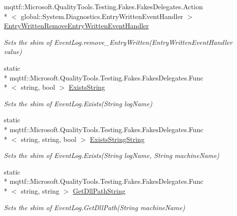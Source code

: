 \begin{DoxyCompactItemize}
mqttf\-::\-Microsoft.\-Quality\-Tools.\-Testing.\-Fakes.\-Fakes\-Delegates.\-Action\\*
$<$ global\-::\-System.\-Diagnostics.\-Entry\-Written\-Event\-Handler $>$ \hyperlink{class_system_1_1_diagnostics_1_1_fakes_1_1_shim_event_log_a504129f76e5a2c76072240100c5d1541}{Entry\-Written\-Remove\-Entry\-Written\-Event\-Handler}
\begin{DoxyCompactList}\small\item\em Sets the shim of Event\-Log.\-remove\-\_\-\-Entry\-Written(\-Entry\-Written\-Event\-Handler value)\end{DoxyCompactList}\item 
static \\*
mqttf\-::\-Microsoft.\-Quality\-Tools.\-Testing.\-Fakes.\-Fakes\-Delegates.\-Func\\*
$<$ string, bool $>$ \hyperlink{class_system_1_1_diagnostics_1_1_fakes_1_1_shim_event_log_a8141d367efa1d9694abae020134b4f65}{Exists\-String}
\begin{DoxyCompactList}\small\item\em Sets the shim of Event\-Log.\-Exists(\-String log\-Name)\end{DoxyCompactList}\item 
static \\*
mqttf\-::\-Microsoft.\-Quality\-Tools.\-Testing.\-Fakes.\-Fakes\-Delegates.\-Func\\*
$<$ string, string, bool $>$ \hyperlink{class_system_1_1_diagnostics_1_1_fakes_1_1_shim_event_log_ac5f53c2cd3b5d539cd52c31d25df0c86}{Exists\-String\-String}
\begin{DoxyCompactList}\small\item\em Sets the shim of Event\-Log.\-Exists(\-String log\-Name, String machine\-Name)\end{DoxyCompactList}\item 
static \\*
mqttf\-::\-Microsoft.\-Quality\-Tools.\-Testing.\-Fakes.\-Fakes\-Delegates.\-Func\\*
$<$ string, string $>$ \hyperlink{class_system_1_1_diagnostics_1_1_fakes_1_1_shim_event_log_a383ea950daeb426e6fa7ceb985eaca0f}{Get\-Dll\-Path\-String}
\begin{DoxyCompactList}\small\item\em Sets the shim of Event\-Log.\-Get\-Dll\-Path(\-String machine\-Name)\end{DoxyCompactList}\item 

\end{DoxyCompactItemize}
